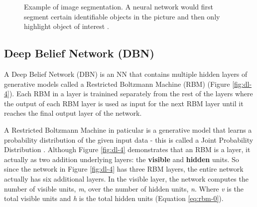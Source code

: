 \documentclass[12pt,twocolumn,letterpaper]{article}
\begin{document}
\begin{figure}[h]    
    \centering
    \caption{Example of image segmentation. A neural network would first segment certain identifiable 
    objects in the picture and then only highlight object of interest \cite{Li22}.}    
    \label{fig:dl-3}
\end{figure}

\subsection{Deep Belief Network (DBN)}
\label{sub:deep-belief-network}

A Deep Belief Network (DBN) is an NN that contains multiple hidden layers of generative models called 
a Restricted Boltzmann Machine (RBM) (Figure \ref{fig:dl-4}). Each RBM in a layer is trainined separately 
from the rest of the layers where the output of each RBM layer is used as input for the next RBM layer until 
it reaches the final output layer of the network.

A Restricted Boltzmann Machine in paticular is a generative model that learns a probability distribution 
of the given input data - this is called a Joint Probability Distribution \cite{Feller57}. Although Figure 
\ref{fig:dl-4} demonstrates that an RBM is a layer, it actually as two addition underlying layers: the 
\textbf{visible} and \textbf{hidden} units. So since the network in Figure \ref{fig:dl-4} has three RBM layers, the 
entire network actually has six additional layers. In the visible layer, the network computes the number 
of visible units, \emph{m}, over the number of hidden units, \emph{n}. Where \emph{v} is the total 
visible units and \emph{h} is the total hidden units (Equation \ref{eq:rbm-0}).
\end{document}
